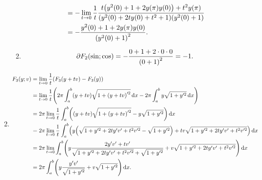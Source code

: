 \documentclass{exercise}
\begin{document}
\begin{enumerate}
\begin{enumerate}
\begin{align*}
				&= -\lim_{t \to 0}\frac{1}{t}\frac{t\parentheses*{y^2\parentheses*{0} + 1 + 2y\parentheses*{\pi}y\parentheses*{0}} + t^2 y\parentheses*{\pi}}{\parentheses*{y^2\parentheses*{0} + 2ty\parentheses*{0} + t^2 + 1}\parentheses*{y^2\parentheses*{0} + 1}}\\
				&= -\frac{y^2\parentheses*{0} + 1 + 2y\parentheses*{\pi}y\parentheses*{0}}{\parentheses*{y^2\parentheses*{0} + 1}^2}.
			\end{align*}
			\item
			\[
				\partial F_2\parentheses*{\sin; \cos} = -\frac{0 + 1 + 2 \cdot 0 \cdot 0}{\parentheses*{0 + 1}^2} = -1.
			\]
		\end{enumerate}
		\item
		\begin{align*}
			F_3\parentheses*{y; v} &= \lim_{t \to 0}\frac{1}{t}\parentheses*{F_3\parentheses*{y + tv} - F_3\parentheses*{y}}\\
			&= \lim_{t \to 0}\frac{1}{t}\parentheses*{2\pi\int_a^b \parentheses*{y + tv}\sqrt{1 + \parentheses*{y + tv}'^2}\d x - 2\pi\int_a^b y\sqrt{1 + y'^2}\d x}\\
			&= 2\pi\lim_{t \to 0}\frac{1}{t}\int_a^b \parentheses*{\parentheses*{y + tv}\sqrt{1 + \parentheses*{y + tv}'^2} - y\sqrt{1 + y'^2}}\d x\\
			&= 2\pi\lim_{t \to 0}\frac{1}{t}\int_a^b \parentheses*{y\parentheses*{\sqrt{1 + y'^2 + 2ty'v' + t^2 v'^2} - \sqrt{1 + y'^2}} + tv\sqrt{1 + y'^2 + 2ty'v' + t^2 v'^2}}\d x\\
			&= 2\pi\lim_{t \to 0}\int_a^b \parentheses*{y\frac{2y'v' + tv'}{\sqrt{1 + y'^2 + 2ty'v' + t^2 v'^2} + \sqrt{1 + y'^2}} + v\sqrt{1 + y'^2 + 2ty'v' + t^2 v'^2}}\d x\\
			&= 2\pi\int_a^b \parentheses*{y\frac{y'v'}{\sqrt{1 + y'^2}} + v\sqrt{1 + y'^2}}\d x.
		\end{align*}
	\end{enumerate}


	\section{}
\end{document}
